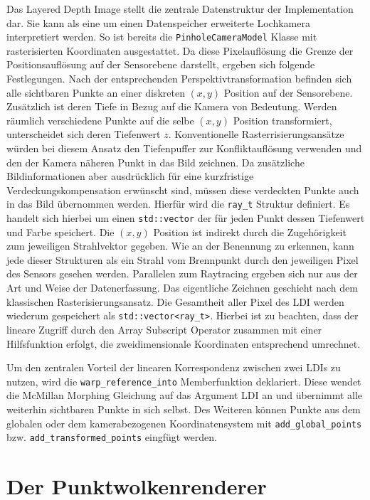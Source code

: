 \documentclass[hyperref, beleg, german]{cgvpub}
\begin{document}
Das Layered Depth Image stellt die zentrale Datenstruktur der Implementation
dar. Sie kann als eine um einen Datenspeicher erweiterte Lochkamera
interpretiert werden. So ist bereits die \texttt{Pinhole\-Camera\-Model} Klasse
mit rasterisierten Koordinaten ausgestattet. Da diese Pixelauflösung die Grenze
der Positionsauflösung auf der Sensorebene darstellt, ergeben sich folgende
Festlegungen. Nach der entsprechenden Perspektivtransformation befinden sich
alle sichtbaren Punkte an einer diskreten \( (x, y) \) Position auf der
Sensorebene. Zusätzlich ist deren Tiefe in Bezug auf die Kamera von Bedeutung.
Werden räumlich verschiedene Punkte auf die selbe \( (x,y) \) Position
transformiert, unterscheidet sich deren Tiefenwert \(z\). Konventionelle
Rasterrisierungsansätze würden bei diesem Ansatz den Tiefenpuffer zur
Konfliktauflösung verwenden und den der Kamera näheren Punkt in das Bild
zeichnen. Da zusätzliche Bildinformationen aber ausdrücklich für eine
kurzfristige Verdeckungskompensation erwünscht sind, müssen diese verdeckten
Punkte auch in das Bild übernommen werden. Hierfür wird die \texttt{ray\_t}
Struktur definiert. Es handelt sich hierbei um einen \texttt{std::vector} der
für jeden Punkt dessen Tiefenwert und Farbe speichert. Die \( (x,y) \) Position
ist indirekt durch die Zugehörigkeit zum jeweiligen Strahlvektor gegeben. Wie
an der Benennung zu erkennen, kann jede dieser Strukturen als ein Strahl vom
Brennpunkt durch den jeweiligen Pixel des Sensors gesehen werden. Parallelen
zum Raytracing ergeben sich nur aus der Art und Weise der Datenerfassung. Das
eigentliche Zeichnen geschieht nach dem klassischen Rasterisierungsansatz. Die
Gesamtheit aller Pixel des LDI werden wiederum gespeichert als
\texttt{std::vector<ray\_t>}. Hierbei ist zu beachten, dass der lineare Zugriff
durch den Array Subscript Operator zusammen mit einer Hilfsfunktion erfolgt,
die zweidimensionale Koordinaten entsprechend umrechnet.

Um den zentralen Vorteil der linearen Korrespondenz zwischen zwei LDIs zu
nutzen, wird die \texttt{warp\-\_reference\-\_into} Memberfunktion deklariert.
Diese wendet die McMillan Morphing Gleichung auf das Argument LDI an und
übernimmt alle weiterhin sichtbaren Punkte in sich selbst. Des Weiteren können
Punkte aus dem globalen oder dem kamerabezogenen Koordinatensystem mit
\texttt{add\-\_global\-\_points} bzw. \texttt{add\-\_transformed\-\_points}
eingfügt werden.

\section{Der Punktwolkenrenderer}
\end{document}
